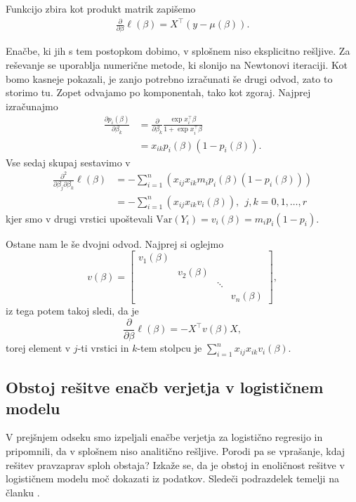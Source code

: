 \documentclass[12pt,a4paper]{amsart}
\theoremstyle{definition} %
\theoremstyle{plain} %
\begin{document}
Funkcijo zbira kot produkt matrik zapišemo
\begin{align}\label{prvi}
    \frac{\partial}{\partial \beta}\ell(\beta) = X^\top(y - \mu(\beta)).
\end{align}

Enačbe, ki jih s tem postopkom dobimo, v splošnem niso eksplicitno rešljive. Za reševanje se uporablja numerične metode, ki slonijo na Newtonovi iteraciji. Kot
bomo kasneje pokazali, je zanjo potrebno izračunati še drugi odvod, zato to storimo tu. Zopet odvajamo po komponentah, tako kot zgoraj. Najprej izračunajmo
\begin{align*}
    \frac{\partial p_{i}(\beta)}{\partial \beta_{k}} &= \frac{\partial}{\partial \beta_{k}} \frac{\exp{x_{i}^\top\beta}}{1+\exp{x_{i}^\top\beta}} \nonumber \\
        &= x_{ik}p_{i}(\beta)(1 - p_{i}(\beta)).
\end{align*}
Vse sedaj skupaj sestavimo v
\begin{align}
    \frac{\partial^2}{\partial \beta_{j}\partial\beta_{k}} \ell(\beta) &= - \sum_{i=1}^{n}\left(x_{ij}x_{ik}m_{i}p_{i}(\beta)(1-p_{i}(\beta))\right) \\
    &= -\sum_{i=1}^{n}\left(x_{ij}x_{ik}v_{i}(\beta)\right),~~j,k = 0,1,\ldots, r
\end{align}
kjer smo v drugi vrstici upoštevali  $\mathrm{Var}(Y_{i}) = v_{i}(\beta) = m_{i}p_{i}(1-p_{i}).$

Ostane nam le še dvojni odvod. Najprej si oglejmo
\[
    v(\beta) = \begin{bmatrix}
        v_{1}(\beta)  & & &\\
        & v_{2}(\beta) & & \\
        & & \ddots & \\
        & & & v_{n}(\beta)
    \end{bmatrix},
\]
iz tega potem takoj sledi, da je
\begin{equation} \label{drugi}
    \frac{\partial}{\partial \beta}\ell(\beta) = -X^\top v(\beta)X,
\end{equation}
torej element v $j$-ti vrstici in $k$-tem stolpcu je $\sum_{i=1}^{n}x_{ij}x_{ik}v_{i}(\beta).$

\subsection{Obstoj rešitve enačb verjetja v logističnem modelu}

V prejšnjem odseku smo izpeljali enačbe verjetja za logistično regresijo in pripomnili, da v splošnem niso analitično rešljive. Porodi pa se vprašanje,
kdaj rešitev pravzaprav sploh obstaja? Izkaže se, da je obstoj in enoličnost rešitve v logističnem modelu moč dokazati iz podatkov. Sledeči podrazdelek temelji na članku
\cite{albert1984existence}.
\end{document}
